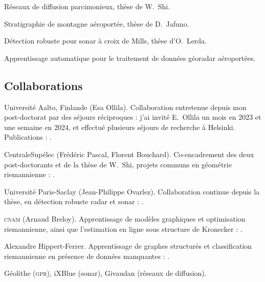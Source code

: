 
Réseaux de diffusion parcimonieux, thèse de W.~Shi.

Stratigraphie de montagne aéroportée, thèse de D.~Jafuno.

Détection robuste pour sonar à croix de Mills, thèse d'O.~Lerda.

Apprentissage automatique pour le traitement de données géoradar aéroportées.


\subsection{Collaborations}
\label{subsec:cv-collaborations}

\begin{cvfields}
  \item[Aalto] Université Aalto, Finlande (Esa Ollila). Collaboration
    entretenue depuis mon post-doctorat par des séjours réciproques : j'ai
    invité E.~Ollila un mois en 2023 et une semaine en 2024, et effectué
    plusieurs séjours de recherche à Helsinki. Publications :
    .
  \item[\textsc{l2s}] CentraleSupélec (Frédéric Pascal, Florent Bouchard).
    Co-encadrement des deux post-doctorants et de la thèse de W.~Shi, projets
    communs en géométrie riemannienne : .
  \item[\textsc{sondra}] Université Paris-Saclay (Jean-Philippe Ovarlez).
    Collaboration continue depuis la thèse, en détection robuste radar et
    sonar : .
  \item[\textsc{cedric}] \textsc{cnam} (Arnaud Breloy). Apprentissage de
    modèles graphiques et optimisation riemannienne, ainsi que l'estimation en
    ligne sous structure de Kronecker :
    .
  \item[\textsc{ign}] Alexandre Hippert-Ferrer. Apprentissage de graphes
    structurés et classification riemannienne en présence de données
    manquantes : .
  \item[Industriels] Géolithe (\textsc{gpr}), iXBlue (sonar), Givaudan
    (réseaux de diffusion).
\end{cvfields}


